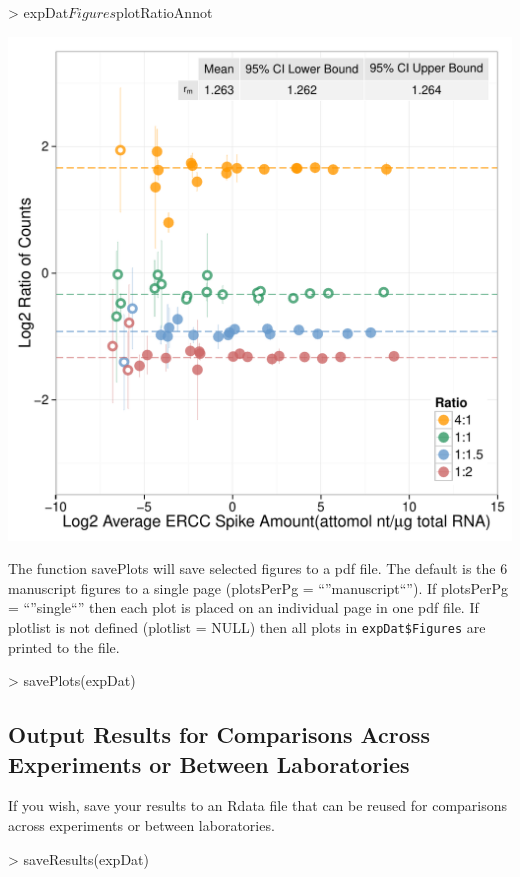 \documentclass{article}
\begin{document}
\clearpage
\begin{center}
\begin{Schunk}
\begin{Sinput}
> expDat$Figures$plotRatioAnnot
\end{Sinput}
\end{Schunk}
\includegraphics{erccdashboardVignette-printPanelFSEQC}
\end{center}
\clearpage
The function savePlots will save selected figures to a pdf file. The default is
the 6 manuscript figures to a single page (plotsPerPg = ``''manuscript``''). If 
plotsPerPg = ``''single``'' then each plot is placed on an individual page in one pdf 
file. If plotlist is not defined (plotlist = NULL) then all plots in 
\verb|expDat$Figures| are printed to the file.
\begin{Schunk}
\begin{Sinput}
> savePlots(expDat)
\end{Sinput}
\end{Schunk}

\subsection{Output Results for Comparisons Across Experiments or Between 
Laboratories}
If you wish, save your results to an Rdata file that can be reused for
comparisons across experiments or between laboratories.
\begin{Schunk}
\begin{Sinput}
> saveResults(expDat)
\end{Sinput}
\end{Schunk}
\end{document}
